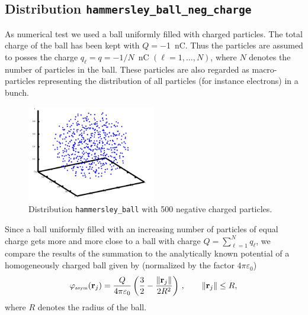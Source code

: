 \subsection{Distribution \texttt{hammersley\_{}ball\_{}neg\_{}charge}}

As numerical test we used a ball uniformly filled with charged particles. The
total charge of the ball has been kept with $Q=-$1~nC. Thus the particles are assumed to
posses the charge $q_\ell=q=-1/N$~nC $(\ell=1,\dots,N)$, where $N$ denotes the number of
particles in the ball. These particles are also regarded as macro-particles representing
the distribution of all particles (for instance electrons) in a bunch. 

\begin{figure}[ht]
  \centering
  \includegraphics[width=0.5\textwidth]{figures/hballneg_500}
  \caption{Distribution \texttt{hammersley\_{}ball} with 500 negative charged particles.}
\end{figure}

Since a ball uniformly filled with an increasing number of particles
of equal charge gets more and more close to a ball with charge
$Q=\sum_{\ell=1}^N q_\ell$, we compare the results of the summation to
the analytically known potential of a homogeneously charged ball given
by (normalized by the factor $4\pi\varepsilon_0$)
\[
  \varphi_{\mbox {\tiny asym}}(\mathbf r_j)
  = \frac{Q}{4\pi\varepsilon_0} \left(
    \frac{3}{2}-\frac{\|\mathbf r_j\|}{2 R^2}\right)\, ,\qquad \|\mathbf r_j\|\leq R,
\]
where $R$ denotes the radius of the ball.\par

